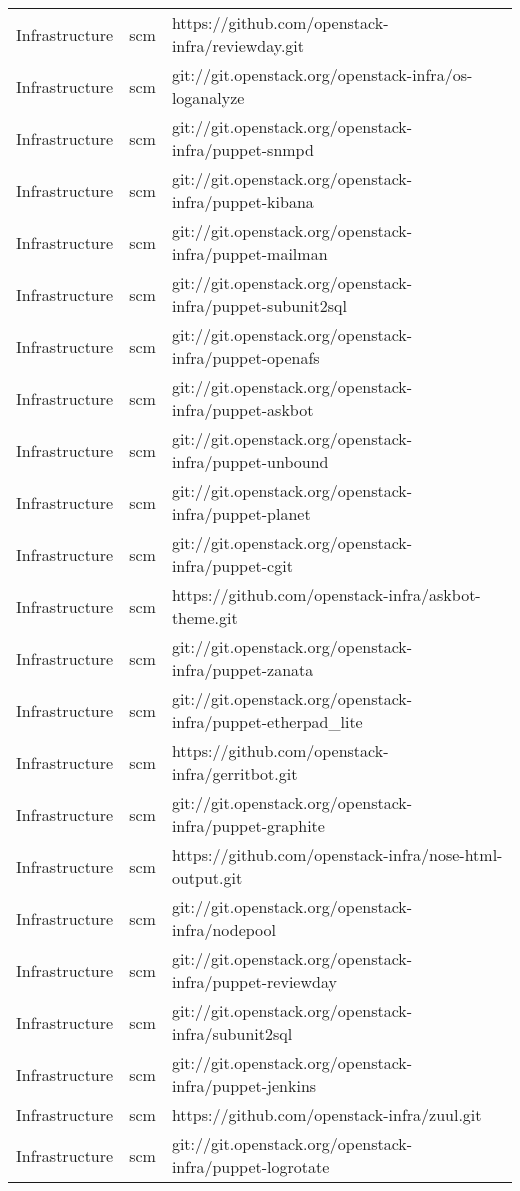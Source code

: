 \begin{center}
\begin{longtable}{|p{4cm}|p{1cm}|p{10cm}|}
Infrastructure&scm&https://github.com/openstack-infra/reviewday.git\\
Infrastructure&scm&git://git.openstack.org/openstack-infra/os-loganalyze\\
Infrastructure&scm&git://git.openstack.org/openstack-infra/puppet-snmpd\\
Infrastructure&scm&git://git.openstack.org/openstack-infra/puppet-kibana\\
Infrastructure&scm&git://git.openstack.org/openstack-infra/puppet-mailman\\
Infrastructure&scm&git://git.openstack.org/openstack-infra/puppet-subunit2sql\\
Infrastructure&scm&git://git.openstack.org/openstack-infra/puppet-openafs\\
Infrastructure&scm&git://git.openstack.org/openstack-infra/puppet-askbot\\
Infrastructure&scm&git://git.openstack.org/openstack-infra/puppet-unbound\\
Infrastructure&scm&git://git.openstack.org/openstack-infra/puppet-planet\\
Infrastructure&scm&git://git.openstack.org/openstack-infra/puppet-cgit\\
Infrastructure&scm&https://github.com/openstack-infra/askbot-theme.git\\
Infrastructure&scm&git://git.openstack.org/openstack-infra/puppet-zanata\\
Infrastructure&scm&git://git.openstack.org/openstack-infra/puppet-etherpad\_lite\\
Infrastructure&scm&https://github.com/openstack-infra/gerritbot.git\\
Infrastructure&scm&git://git.openstack.org/openstack-infra/puppet-graphite\\
Infrastructure&scm&https://github.com/openstack-infra/nose-html-output.git\\
Infrastructure&scm&git://git.openstack.org/openstack-infra/nodepool\\
Infrastructure&scm&git://git.openstack.org/openstack-infra/puppet-reviewday\\
Infrastructure&scm&git://git.openstack.org/openstack-infra/subunit2sql\\
Infrastructure&scm&git://git.openstack.org/openstack-infra/puppet-jenkins\\
Infrastructure&scm&https://github.com/openstack-infra/zuul.git\\
Infrastructure&scm&git://git.openstack.org/openstack-infra/puppet-logrotate\\

\end{longtable}
\end{center}

